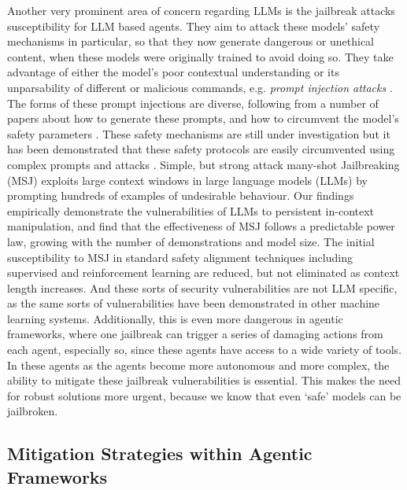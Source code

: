 Another very prominent area of concern regarding LLMs is the jailbreak attacks susceptibility for LLM based agents. They aim to attack these models' safety mechanisms in particular, so that they now generate dangerous or unethical content, when these models were originally trained to avoid doing so. They take advantage of either the model's poor contextual understanding or its unparsability of different or malicious commands, e.g. \emph{prompt injection attacks} \cite{perez2022ignore}. The forms of these prompt injections are diverse, following from a number of papers about how to generate these prompts, and how to circumvent the model's safety parameters \cite{Zou2023Jailbreaking}. These safety mechanisms are still under investigation but it has been demonstrated that these safety protocols are easily circumvented using complex prompts and attacks \cite{Carlini2019Adversarial}. Simple, but strong attack many-shot Jailbreaking (MSJ)\cite{Anil2024manyshot} exploits large context windows in large language models (LLMs) by prompting hundreds of examples of undesirable behaviour. Our findings empirically demonstrate the vulnerabilities of LLMs to persistent in-context manipulation, and find that the effectiveness of MSJ follows a predictable power law, growing with the number of demonstrations and model size. The initial susceptibility to MSJ in standard safety alignment techniques including supervised and reinforcement learning are reduced, but not eliminated as context length increases. And these sorts of security vulnerabilities are not LLM specific, as the same sorts of vulnerabilities have been demonstrated in other machine learning systems. Additionally, this is even more dangerous in agentic frameworks, where one jailbreak can trigger a series of damaging actions from each agent, especially so, since these agents have access to a wide variety of tools. In these agents as the agents become more autonomous and more complex, the ability to mitigate these jailbreak vulnerabilities is essential. This makes the need for robust solutions more urgent, because we know that even ‘safe’ models can be jailbroken.

\subsection{Mitigation Strategies within Agentic Frameworks}

